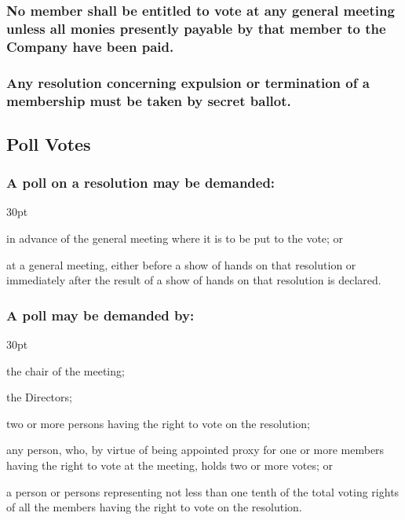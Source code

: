 \documentclass[12pt]{article}
\def\clauseindent{30pt}
\newenvironment{subindentpara}{\raggedright\begin{adjustwidth}{\clauseindent}{}\begin{hanginglist}}{\end{hanginglist}\end{adjustwidth}}
\begin{document}
\subsubsection[Member May Not Vote Unless All Monies Payable Paid]{No member shall be entitled to vote at any general meeting unless all monies presently payable by that member to the Company have been paid.}
\subsubsection[Votes on Expulsion/Termination by Secret Ballot Only]{Any resolution concerning expulsion or termination of a membership must be taken by secret ballot.}

\subsection{Poll Votes}
\subsubsection[Specifics of Poll on Resolution]{A poll on a resolution may be demanded:}
\begin{subindentpara}
    \item in advance of the general meeting where it is to be put to the vote; or
    \item at a general meeting, either before a show of hands on that resolution or immediately after the result of a show of hands on that resolution is declared.
\end{subindentpara}
\subsubsection[Specifics of Poll Demand]{A poll may be demanded by:}
\begin{subindentpara}
    \item the chair of the meeting;
    \item the Directors;
    \item two or more persons having the right to vote on the resolution;
    \item any person, who, by virtue of being appointed proxy for one or more members having the right to vote at the meeting, holds two or more votes; or
    \item a person or persons representing not less than one tenth of the total voting rights of all the members having the right to vote on the resolution.
\end{subindentpara}
\end{document}

